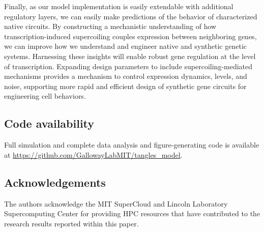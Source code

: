 \documentclass[11pt]{article}
\begin{document}
Finally, as our model implementation is easily extendable with additional regulatory layers, we can easily make predictions of the behavior of characterized native circuits. By constructing a mechanistic understanding of how transcription-induced supercoiling couples expression between neighboring genes, we can improve how we understand and engineer native and synthetic genetic systems. Harnessing these insights will enable robust gene regulation at the level of transcription. Expanding design parameters to include supercoiling-mediated mechanisms provides a mechanism to control expression dynamics, levels, and noise, supporting more rapid and efficient design of synthetic gene circuits for engineering cell behaviors.

\subsection{Code availability}
Full simulation and complete data analysis and figure-generating code is available at \url{https://github.com/GallowayLabMIT/tangles_model}.

\subsection{Acknowledgements}
The authors acknowledge the MIT SuperCloud and Lincoln Laboratory Supercomputing Center \parencite{reutherInteractiveSupercomputing402018} for providing HPC resources that have contributed to the research results reported within this paper.

\printbibliography

\clearpage
\appendix
\titleformat{\subsection}[hang]{\bfseries}{\thesubsection}{0em}{\;\;}
\renewcommand{\appendixpagename}{Supplemental information}
\renewcommand{\thefigure}{S\arabic{figure}}
\renewcommand{\theequation}{S\arabic{equation}}
\setcounter{equation}{0}
\setcounter{figure}{0}
\appendixpage
\end{document}
